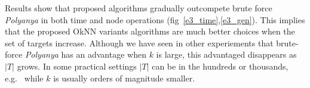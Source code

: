 
Results show that proposed algorithms gradually outcompete brute force \textit{Polyanya} in both time and node operations (fig~\ref{e3_time},\ref{e3_gen}). This implies that the proposed OkNN variants algorithms are much better choices when the set of targets increase. Although we have seen in other experiements that brute-force \textit{Polyanya} has an advantage when $k$ is large, this advantaged disappears as $|T|$ grows. In some practical settings $|T|$ can be in the hundreds or thousands, e.g.~\cite{abeywickrama2016k} while $k$ is usually orders of magnitude smaller. 



